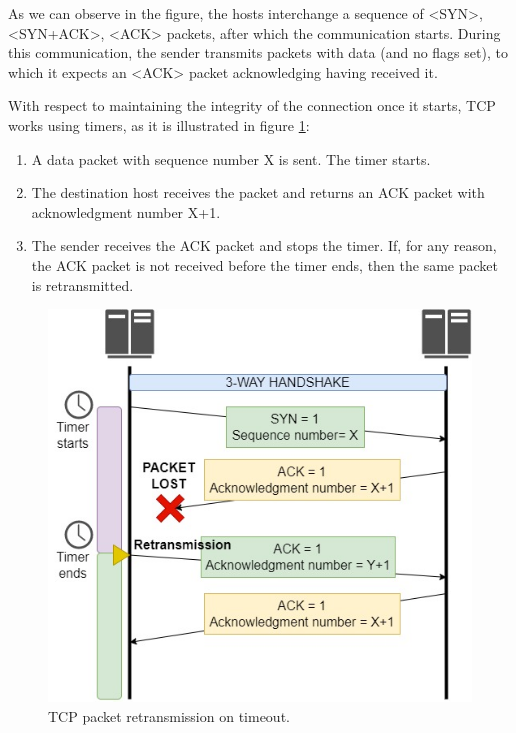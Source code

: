 \documentclass[12pt]{report} %
\begin{document}
As we can observe in the figure, the hosts interchange a sequence of <SYN>, <SYN+ACK>, <ACK> packets, after which the communication starts. During this communication, the sender transmits packets with data (and no flags set), to which it expects an <ACK> packet acknowledging having received it.

With respect to maintaining the integrity of the connection once it starts, TCP works using timers, as it is illustrated in figure \ref{fig:tcp_retransmission}:
\begin{enumerate}
\item A data packet with sequence number X is sent. The timer starts.
\item The destination host receives the packet and returns an ACK packet with acknowledgment number X+1.
\item The sender receives the ACK packet and stops the timer. If, for any reason, the ACK packet is not received before the timer ends, then the same packet is retransmitted.
\end{enumerate}

\begin{figure}[H]
	\centering
	\includegraphics[width=12cm]{tcp_retransmission.jpg}
	\caption{TCP packet retransmission on timeout.}
	\label{fig:tcp_retransmission}
\end{figure}
\end{document}
